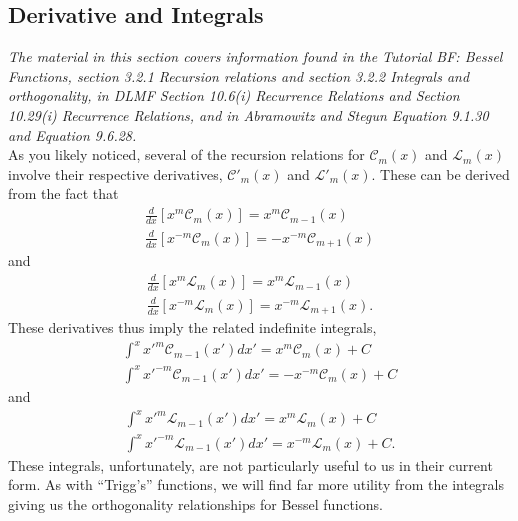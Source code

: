 \documentclass[11pt]{report}
\newcommand{\fpar}[1]{\left({#1}\right)}
\begin{document}
\subsection{Derivative and Integrals}

\emph{The material in this section covers information found in the Tutorial BF: Bessel Functions, section 3.2.1 Recursion relations and section 3.2.2 Integrals and orthogonality, in DLMF Section 10.6(i) Recurrence Relations and Section 10.29(i) Recurrence Relations, and in Abramowitz and Stegun Equation 9.1.30 and Equation 9.6.28.}\\


As you likely noticed, several of the recursion relations for $\mathscr{C}_m(x)$ and $\mathscr{L}_m(x)$ involve their respective derivatives, $\mathscr{C}'_m(x)$ and $\mathscr{L}'_m(x)$. These can be derived from the fact that
    \begin{align*}
        \frac{d}{dx}\left[x^m\mathscr{C}_m(x)\right] = x^m\mathscr{C}_{m-1}(x)\\
        \frac{d}{dx}\left[x^{-m}\mathscr{C}_m(x)\right] = -x^{-m}\mathscr{C}_{m+  1}(x)
    \end{align*}
and
    \begin{align*}
        \frac{d}{dx}\left[x^m\mathscr{L}_m(x)\right] = x^m\mathscr{L}_{m-1}(x)\\
        \frac{d}{dx}\left[x^{-m}\mathscr{L}_m(x)\right] = x^{-m}\mathscr{L}_{m+1}(x).
    \end{align*}
These derivatives thus imply the related indefinite integrals,
    \begin{align*}
        \int^x x'^m\mathscr{C}_{m-1}\fpar{x'}dx' = x^m\mathscr{C}_m\fpar{x}+C\\
        \int^x x'^{-m}\mathscr{C}_{m-1}\fpar{x'}dx' = -x^{-m}\mathscr{C}_m\fpar{x}+C
    \end{align*}
and
    \begin{align*}
        \int^x x'^m\mathscr{L}_{m-1}\fpar{x'}dx' = x^m\mathscr{L}_m\fpar{x}+C\\
        \int^x x'^{-m}\mathscr{L}_{m-1}\fpar{x'}dx' = x^{-m}\mathscr{L}_m\fpar{x}+C.
    \end{align*}
These integrals, unfortunately, are not particularly useful to us in their current form. As with ``Trigg's'' functions, we will find far more utility from the integrals giving us the orthogonality relationships for Bessel functions.
\end{document}
